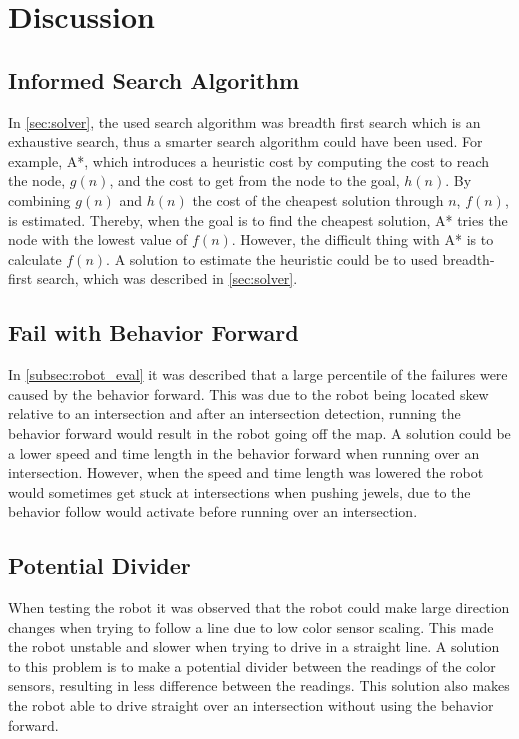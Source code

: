 \documentclass[../report.tex]{subfiles}
\begin{document}
\section{Discussion}

\subsection*{Informed Search Algorithm}
In \autoref{sec:solver}, the used search algorithm was breadth first search which is an exhaustive search, thus a smarter search algorithm could have been used. For example, A*, which introduces a heuristic cost by computing the cost to reach the node, $g(n)$, and the cost to get from the node to the goal, $h(n)$. By combining $g(n)$ and $h(n)$ the cost of the cheapest solution through $n$, $f(n)$, is estimated. Thereby, when the goal is to find the cheapest solution, A* tries the node with the lowest value of $f(n)$. However, the difficult thing with A* is to calculate $f(n)$. A solution to estimate the heuristic could be to used breadth-first search, which was described in \autoref{sec:solver}.

\subsection*{Fail with Behavior Forward}
In \autoref{subsec:robot_eval} it was described that a large percentile of the failures were caused by the behavior forward. This was due to the robot being located skew relative to an intersection and after an intersection detection, running the behavior forward would result in the robot going off the map. A solution could be a lower speed and time length in the behavior forward when running over an intersection. However, when the speed and time length was lowered the robot would sometimes get stuck at intersections when pushing jewels, due to the behavior follow would activate before running over an intersection. 

\subsection*{Potential Divider}
When testing the robot it was observed that the robot could make large direction changes when trying to follow a line due to low color sensor scaling. This made the robot unstable and slower when trying to drive in a straight line. A solution to this problem is to make a potential divider \cite{potential_divider} between the readings of the color sensors, resulting in less difference between the readings. This solution also makes the robot able to drive straight over an intersection without using the behavior forward.  
\end{document}
